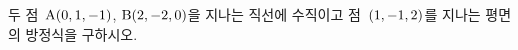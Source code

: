 두 점~$\mathrm{A}(0{,}\mkern3mu\mathopen{}1{,}\mkern3mu\mathopen{}-1)$, $\mathrm{B}(2{,}\mkern3mu\mathopen{}-2{,}\mkern3mu\mathopen{}0)$을 지나는 직선에 수직이고 점~$(1{,}\mkern3mu\mathopen{}-1{,}\mkern3mu\mathopen{}2)$를 지나는 평면의 방정식을 구하시오.
